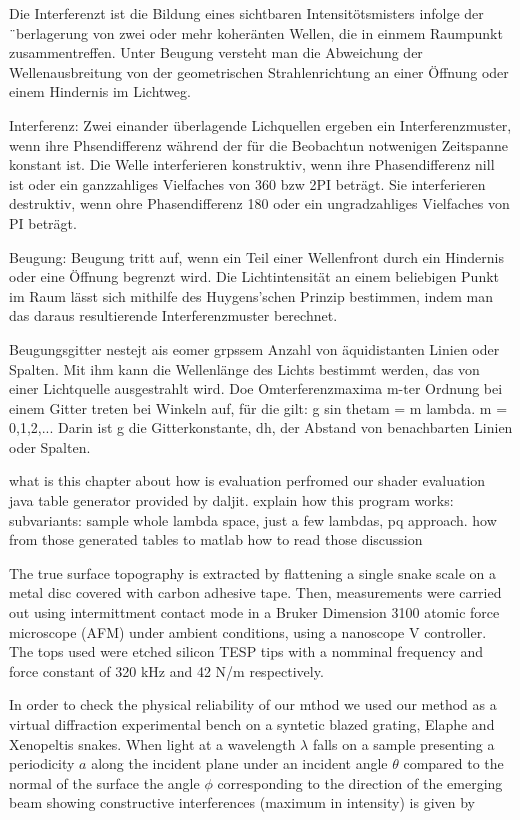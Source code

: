 Die Interferenzt ist die Bildung eines sichtbaren Intensitötsmisters infolge der ¨berlagerung von zwei oder mehr koheränten Wellen, die in einmem Raumpunkt zusammentreffen. Unter Beugung versteht man die Abweichung der Wellenausbreitung von der geometrischen Strahlenrichtung an einer Öffnung oder einem Hindernis im Lichtweg.

Interferenz: Zwei einander überlagende Lichquellen ergeben ein Interferenzmuster, wenn ihre Phsendifferenz während der für die Beobachtun notwenigen Zeitspanne konstant ist. Die Welle interferieren konstruktiv, wenn ihre Phasendifferenz nill ist oder ein ganzzahliges Vielfaches von 360 bzw 2PI beträgt. Sie interferieren destruktiv, wenn ohre Phasendifferenz 180 oder ein ungradzahliges Vielfaches von PI beträgt.

Beugung: Beugung tritt auf, wenn ein Teil einer Wellenfront durch ein Hindernis oder eine Öffnung begrenzt wird. Die Lichtintensität an einem beliebigen Punkt im Raum lässt sich mithilfe des Huygens'schen Prinzip bestimmen, indem man das daraus resultierende Interferenzmuster berechnet.

Beugungsgitter nestejt ais eomer grpssem Anzahl von äquidistanten Linien oder Spalten. Mit ihm kann die Wellenlänge des Lichts bestimmt werden, das von einer Lichtquelle ausgestrahlt wird. Doe Omterferenzmaxima m-ter Ordnung bei einem Gitter treten bei Winkeln auf, für die gilt: g sin thetam = m lambda. m = 0,1,2,...
Darin ist g die Gitterkonstante, dh, der Abstand von benachbarten Linien oder Spalten.







what is this chapter about
how is evaluation perfromed
our shader
evaluation java table generator provided by daljit.
explain how this program works:
subvariants: sample whole lambda space, just a few lambdas, pq approach.
how from those generated tables to matlab
how to read those
discussion

The true surface topography is extracted by flattening a single snake scale on a metal disc covered with carbon adhesive tape. Then, measurements were carried out using intermittment contact mode in a Bruker Dimension 3100 atomic force microscope (AFM) under ambient conditions, using a nanoscope V controller. The tops used were etched silicon TESP tips with a nomminal frequency and force constant of 320 kHz and 42 N/m respectively. 

In order to check the physical reliability of our mthod we used our method as a virtual diffraction experimental bench on a syntetic blazed grating, Elaphe and Xenopeltis snakes. When light at a wavelength $\lambda$ falls on a sample presenting a periodicity $a$ along the incident plane under an incident angle $\theta$ compared to the normal of the surface the angle $\phi$ corresponding to the direction of the emerging beam showing constructive interferences (maximum in intensity) is given by

